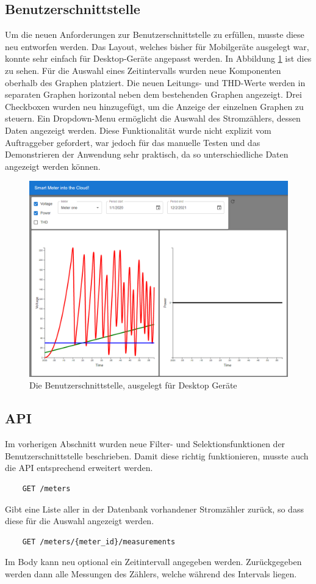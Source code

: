 \subsection{Benutzerschnittstelle}
Um die neuen Anforderungen zur Benutzerschnittstelle zu erfüllen, musste diese neu entworfen werden.
Das Layout, welches bisher für Mobilgeräte ausgelegt war, konnte sehr einfach für Desktop-Geräte angepasst werden.
In Abbildung \ref{fig:phase2-ui} ist dies zu sehen.
Für die Auswahl eines Zeitintervalls wurden neue Komponenten oberhalb des Graphen platziert.
Die neuen Leitungs- und \ac{THD}-Werte werden in separaten Graphen horizontal neben dem bestehenden Graphen angezeigt.
Drei Checkboxen wurden neu hinzugefügt, um die Anzeige der einzelnen Graphen zu steuern.
Ein Dropdown-Menu ermöglicht die Auswahl des Stromzählers, dessen Daten angezeigt werden.
Diese Funktionalität wurde nicht explizit vom Auftraggeber gefordert, war jedoch für das manuelle Testen
und das Demonstrieren der Anwendung sehr praktisch, da so unterschiedliche Daten angezeigt werden können.
\begin{figure}[H]
    \centering
    \includegraphics[width=1.0\textwidth]{gfx/phase2}
    \caption{
        Die Benutzerschnittstelle, ausgelegt für Desktop Geräte
    }
    \label{fig:phase2-ui}
\end{figure}
\subsection{\ac{API}}
Im vorherigen Abschnitt wurden neue Filter- und Selektionsfunktionen der Benutzerschnittstelle beschrieben.
Damit diese richtig funktionieren, musste auch die \ac{API} entsprechend erweitert werden.
\begin{verbatim}
    GET /meters
\end{verbatim}
Gibt eine Liste aller in der Datenbank vorhandener Stromzähler zurück, so dass diese für die Auswahl angezeigt werden.
\begin{verbatim}
    GET /meters/{meter_id}/measurements
\end{verbatim}
Im Body kann neu optional ein Zeitintervall angegeben werden.
Zurückgegeben werden dann alle Messungen des Zählers, welche während des Intervals liegen.




